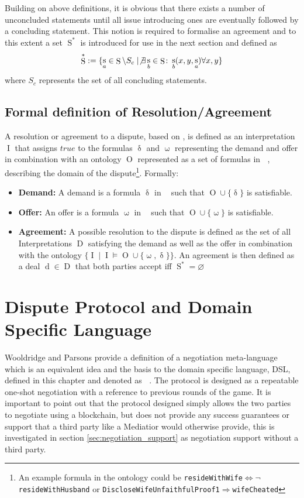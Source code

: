 \documentclass[12pt,msc,a4paper,oneside]{ucl_thesis}
\DeclareMathOperator{\Metalang}{\mathcal{L}_m}
\DeclareMathOperator{\Proplang}{\mathcal{L}(N)}
\DeclareMathOperator{\Interpretation}{I}
\DeclareMathOperator{\Ontology}{O}
\DeclareMathOperator{\Deal}{D}
\DeclareMathOperator{\deal}{d}
\DeclareMathOperator{\demand}{\delta}
\DeclareMathOperator{\offer}{\omega}
\DeclareMathOperator{\Statement}{S}
\DeclareMathOperator{\statement}{s}
\begin{document}
Building on above definitions, it is obvious that there exists a number of unconcluded statements until all issue introducing ones are eventually followed by a concluding statement. This notion is required to formalise an agreement and to this extent a set $\Statement^*$ is introduced for use in the next section and defined as
\begin{equation}
    \Statement^* := \{\statement_a \in \Statement\setminus S_c \mid \not\exists \statement_b \in \Statement \colon \statement_b(x,y,\statement_a)\forall x,y \}
\end{equation}
where $S_c$ represents the set of all concluding statements.


\subsection{Formal definition of Resolution/Agreement} \label{sec:agreement}
A resolution or agreement to a dispute, based on \cite{Ragone2008}, is defined as an interpretation $\Interpretation$ that assigns $true$ to the formulas $\demand$ and $\offer$ representing the demand and offer in combination with an ontology $\Ontology$ represented as a set of formulas in $\Proplang$, describing the domain of the dispute\footnote{An example formula in the ontology could be \texttt{resideWithWife$\Leftrightarrow\neg$resideWithHusband} or \texttt{DiscloseWifeUnfaithfulProof1$\Rightarrow$wifeCheated}}. Formally:
\begin{itemize}
    \item \textbf{Demand:} A demand is a formula $\demand$ in $\Proplang$ such that $\Ontology \cup \{\demand\}$ is satisfiable.
    \item \textbf{Offer:} An offer is a formula $\offer$ in $\Proplang$ such that $\Ontology \cup \{\offer\}$ is satisfiable.
    \item \textbf{Agreement:} A possible resolution to the dispute is defined as the set of all Interpretations $\Deal$ satisfying the demand as well as the offer in combination with the ontology $\{\Interpretation \mid \Interpretation \models \Ontology \cup \{\offer, \demand\}\}$. An agreement is then defined as a deal $\deal \in \Deal$ that both parties accept iff $\Statement^* = \varnothing$
\end{itemize}

\section{Dispute Protocol and Domain Specific Language}
Wooldridge and Parsons \cite{Wooldridge:2000:LN:3006433.3006516} provide a definition of a negotiation meta-language which is an equivalent idea and the basis to the domain specific language, DSL, defined in this chapter and denoted as $\Metalang$. The protocol is designed as a repeatable one-shot negotiation with a reference to previous rounds of the game. It is important to point out that the protocol designed simply allows the two parties to negotiate using a blockchain, but does not provide any success guarantees or support that a third party like a Mediatior would otherwise provide, this is investigated in section \ref{sec:negotiation_support} as negotiation support without a third party.
\end{document}
